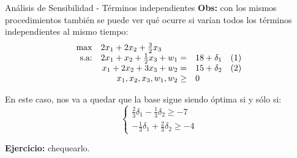 \documentclass[10pt, aspectratio=169]{beamer}
\begin{document}
\begin{frame}{Análisis de Sensibilidad - Términos independientes}
    \textbf{Obs:} con los mismos procedimientos también se puede ver qué ocurre si varían todos los términos independientes al mismo tiempo:
                $$
    \begin{array}{rrlc}
    \max & \multicolumn{2}{l}{2x_1+2x_2+\frac{3}{2}x_3}\\
    \text{s.a:}& 2x_1+x_2+\frac{1}{2}x_3 + w_1 = & 18+\delta_1 & (1)\\
     & x_1+2x_2+3x_3 + w_2 = & 15+\delta_2 & (2)\\
     & x_1, x_2, x_3, w_1, w_2\geq & 0 \\
    \end{array}
    $$
    
    En este caso, nos va a quedar que la base sigue siendo óptima si y sólo si:
    \[
    \begin{cases}
            \frac{2}{3}\delta_1 - \frac{1}{3}\delta_2 \geq -7 \\
            -\frac{1}{3}\delta_1 + \frac{2}{3}\delta_2 \geq -4
    \end{cases}
    \]
    
    \textbf{Ejercicio:} chequearlo.
    
\end{frame}
\end{document}
